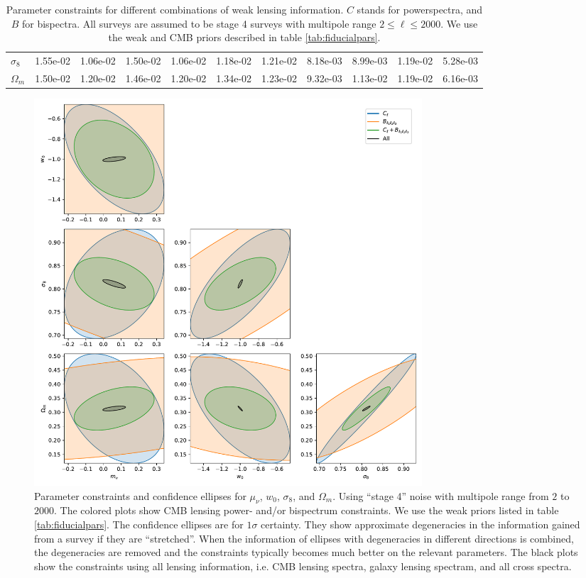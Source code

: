 \documentclass[11pt]{article} %
\begin{document}
\begin{table}
\begin{tabular}{|l|r|rrr|rrr|rrr|}
        $\sigma_8$ &    1.55e-02 &  1.06e-02 &  1.50e-02 &        1.06e-02 & 1.18e-02 & 1.21e-02 &      8.18e-03 &      8.99e-03 &      1.19e-02 &             5.28e-03 \\
        $\Omega_m$ &    1.50e-02 &  1.20e-02 &  1.46e-02 &        1.20e-02 & 1.34e-02 & 1.23e-02 &      9.32e-03 &      1.13e-02 &      1.19e-02 &             6.16e-03 \\
       \hline
        \end{tabular}
\caption{Parameter constraints for different combinations of weak lensing information. $C$ stands for powerspectra, and $B$ for bispectra. All surveys are assumed to be stage 4 surveys with multipole range $2 \leq \ell \leq 2000$. We use the weak and CMB priors described in table \ref{tab:fiducialpars}.}
\label{tab:paramconstraintstight}
\end{table}


\begin{figure}
    \centering
    \includegraphics[width=0.7\textwidth]{figures/param_constraints_tight_cmb_weak_prior.pdf}
    \caption{Parameter constraints and confidence ellipses for $\mu_\nu$, $w_0$, $\sigma_8$, and $\Omega_m$. Using ``stage 4'' noise with multipole range from $2$ to $2000$. The colored plots show CMB lensing power- and/or bispectrum constraints. We use the weak priors listed in table \ref{tab:fiducialpars}. The confidence ellipses are for $1\sigma$ certainty. They show approximate degeneracies in the information gained from a survey if they are ``stretched''. When the information of ellipses with degeneracies in different directions is combined, the degeneracies are removed and the constraints typically becomes much better on the relevant parameters. The black plots show the constraints using all lensing information, i.e. CMB lensing spectra, galaxy lensing spectram, and all cross spectra.}
    \label{fig:paramconstraintstightcmb}
\end{figure}
\end{document}
